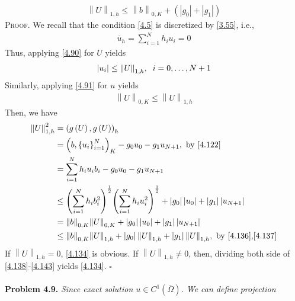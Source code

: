 \documentclass[a4paper]{article}
\numberwithin{equation}{section}
\begin{document}
\begin{align}
\label{4.134}
{\left\| U \right\|_{1,h}} \le {\left\| b \right\|_{0,K}} + \left( {\left| {{g_0}} \right| + \left| {{g_1}} \right|} \right)
\end{align}
\textsc{Proof.} We recall that the condition \eqref{4.5} is discretized by \eqref{3.55}, i.e.,
\begin{align}
{\overline u _h} = \sum\limits_{i = 1}^N {{h_i}{u_i}}  = 0
\end{align}
Thus, applying \eqref{4.90} for $U$ yields
\begin{align}
\label{4.136}
\left| {{u_i}} \right| \le {\left\| U \right\|_{1,h}},\hspace{0.2cm}i=0,\ldots,N+1
\end{align}
Similarly, applying \eqref{4.91} for $u$ yields 
\begin{align}
\label{4.137}
{\left\| U \right\|_{0,K}} \le {\left\| U \right\|_{1,h}}
\end{align}
Then, we have
\begin{align}
\label{4.138}
\left\| U \right\|_{1,h}^2 &= {\left( {g\left( U \right),g\left( U \right)} \right)_h}\\
 &= {\left( {b,\left\{ {{u_i}} \right\}_{i = 1}^N} \right)_K} - {g_0}{u_0} - {g_1}{u_{N + 1}},\mbox{ by \eqref{4.122}}\\
& = \sum\limits_{i = 1}^N {{h_i}{u_i}{b_i}}  - {g_0}{u_0} - {g_1}{u_{N + 1}}\\
& \le {\left( {\sum\limits_{i = 1}^N {{h_i}b_i^2} } \right)^{\frac{1}{2}}}{\left( {\sum\limits_{i = 1}^N {{h_i}u_i^2} } \right)^{\frac{1}{2}}} + \left| {{g_0}} \right|\left| {{u_0}} \right| + \left| {{g_1}} \right|\left| {{u_{N + 1}}} \right|\\
 &= {\left\| b \right\|_{0,K}}{\left\| U \right\|_{0,K}} + \left| {{g_0}} \right|\left| {{u_0}} \right| + \left| {{g_1}} \right|\left| {{u_{N + 1}}} \right|\\
 &\le {\left\| b \right\|_{0,K}}{\left\| U \right\|_{1,h}} + \left| {{g_0}} \right|{\left\| U \right\|_{1,h}} + \left| {{g_1}} \right|{\left\| U \right\|_{1,h}},\mbox{ by \eqref{4.136},\eqref{4.137}}\label{4.143}
\end{align}
If ${\left\| U \right\|_{1,h}}=0$, \eqref{4.134} is obvious. If ${\left\| U \right\|_{1,h}}\ne 0$, then, dividing both side of \eqref{4.138}-\eqref{4.143} yields \eqref{4.134}. \hfill $\square$\\
\\
\textbf{Problem 4.9.} \textit{Since exact solution $u\in C^1\left(\overline{\Omega}\right)$. We can define projection}
\end{document}
